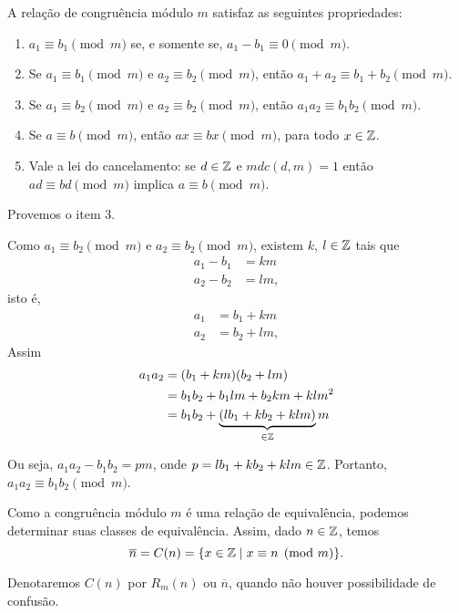 \begin{teorema}
	A rela{\c c}{\~a}o de congru{\^e}ncia m{\'o}dulo $m$ satisfaz as seguintes propriedades:
	\begin{enumerate}
		\item $a_{1}\equiv b_{1}\pmod{m}$ se, e somente se, $a_{1}-b_{1}\equiv 0\pmod{m}$.
		\item Se $a_{1}\equiv b_{1}\pmod{m}$ e $a_{2}\equiv b_{2}\pmod{m}$, ent{\~a}o $a_{1}+a_{2}\equiv b_{1}+b_{2}\pmod{m}$.
		\item Se $a_{1}\equiv b_{2}\pmod{m}$ e $a_{2}\equiv b_{2}\pmod{m}$, ent{\~a}o $a_{1}a_{2}\equiv b_{1}b_{2}\pmod{m}$.
		\item Se $a\equiv b\pmod{m}$, ent{\~a}o $ax\equiv bx\pmod{m}$, para todo $x \in \mathbb{Z}$.
		\item Vale a lei do cancelamento: se $d \in \mathbb{Z}$ e $mdc(d,m) = 1$ ent{\~a}o $ad \equiv bd \pmod{m}$ implica $a\equiv b \pmod{m}$.
	\end{enumerate}
\end{teorema}
\begin{prova}
	Provemos o item 3.
	
	Como $a_{1}\equiv b_{2}\pmod{m}$ e $a_{2}\equiv b_{2}\pmod{m}$, existem $k$, $l \in \mathbb{Z}$ tais que
	\begin{align*}
		a_1 - b_1 &= km\\
		a_2 - b_2 &= lm,
	\end{align*}
	isto é,
	\begin{align*}
		a_1 &= b_1 + km\\
		a_2 &= b_2 + lm,
	\end{align*}
	Assim
	\begin{align*}
		a_1a_2 &= (b_1 + km)(b_2 + lm) \\ &= b_1b_2 + b_1lm + b_2km + klm^2 \\ &= b_1b_2 + \underbrace{(lb_{1}+kb_{2}+klm)}_{\in \mathbb{Z}}m
	\end{align*}
	
	Ou seja, $a_1a_2 - b_1b_2 = pm$, onde $p = lb_1 + kb_2 + klm \in \mathbb{Z}$. Portanto, $a_1a_2 \equiv b_1b_2 \pmod{m}$.
\end{prova}

Como a congru{\^e}ncia m{\'o}dulo $m$ {\'e} uma rela{\c c}{\~a}o de equival{\^e}ncia, podemos determinar suas classes de equival{\^e}ncia. Assim, dado $n \in \mathbb{Z}$, temos
\[
	\overline{n} = C(n) = \{x \in \mathbb{Z} \mid x\equiv n \pmod{m}\}.
\]

Denotaremos $C(n)$ por $R_{m}(n)$ ou $\overline{n}$, quando n{\~a}o houver possibilidade de confus{\~a}o.

